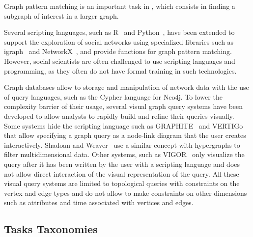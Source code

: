 
Graph pattern matching is an important task in \sna, which consists in finding a subgraph of interest in a larger graph\cite{fanGraphPatternMatching2012}.

Several scripting languages, such as R~\cite{Rstat} and Python~\cite{Python}, have been extended to support the exploration of social networks using specialized libraries such as igraph~\cite{igraph} and NetworkX~\cite{NetworkX}, and provide functions for graph pattern matching.
However, social scientists are often challenged to use scripting languages and programming, as they often do not have formal training in such technologies.

Graph databases allow to storage and manipulation of network data with the use of query languages, such as the Cypher language for Neo4j\cite{neo4j}.
To lower the complexity barrier of their usage, several visual graph query systems have been developed to allow analysts to rapidly build and refine their queries visually.
Some systems hide the scripting language such as GRAPHITE~\cite{chauGRAPHITEVisualQuery2008} and VERTIGo~\cite{cuencaVERTIGoVisualPlatform2021} that allow specifying a graph query as a node-link diagram that the user creates interactively.
Shadoan and Weaver~\cite{shadoanVisualAnalysisHigherOrder2013} use a similar concept with hypergraphs to filter multidimensional data.
Other systems, such as VIGOR~\cite{pientaVIGORInteractiveVisual2018} only visualize the query after it has been written by the user with a scripting language and does not allow direct interaction of the visual representation of the query.
All these visual query systems are limited to topological queries with constraints on the vertex and edge types and do not allow to make constraints on other dimensions such as attributes and time associated with vertices and edges.

\iffalse
\subsection{Tasks Taxonomies}

